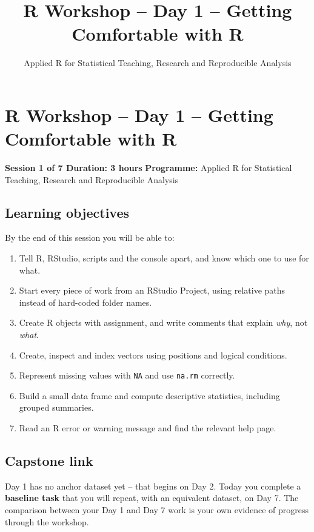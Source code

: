 \documentclass[11pt]{article}
\title{R Workshop -- Day 1 -- Getting Comfortable with R}
\author{Applied R for Statistical Teaching, Research and Reproducible Analysis}
\date{}
\providecommand{\tightlist}{%
  \setlength{\itemsep}{0pt}\setlength{\parskip}{0pt}}
\begin{document}
\maketitle
\tableofcontents
\newpage
\hypertarget{r-workshop-day-1-getting-comfortable-with-r}{%
\section{R Workshop -- Day 1 -- Getting Comfortable with
R}\label{r-workshop-day-1-getting-comfortable-with-r}}

\textbf{Session 1 of 7 \textbar{} Duration: 3 hours} \textbf{Programme:}
Applied R for Statistical Teaching, Research and Reproducible Analysis

\hypertarget{learning-objectives}{%
\subsection{Learning objectives}\label{learning-objectives}}

By the end of this session you will be able to:

\begin{enumerate}
\def\labelenumi{\arabic{enumi}.}
\tightlist
\item
  Tell R, RStudio, scripts and the console apart, and know which one to
  use for what.
\item
  Start every piece of work from an RStudio Project, using relative
  paths instead of hard-coded folder names.
\item
  Create R objects with assignment, and write comments that explain
  \emph{why}, not \emph{what}.
\item
  Create, inspect and index vectors using positions and logical
  conditions.
\item
  Represent missing values with \texttt{NA} and use \texttt{na.rm}
  correctly.
\item
  Build a small data frame and compute descriptive statistics, including
  grouped summaries.
\item
  Read an R error or warning message and find the relevant help page.
\end{enumerate}

\hypertarget{capstone-link}{%
\subsection{Capstone link}\label{capstone-link}}

Day 1 has no anchor dataset yet -- that begins on Day 2. Today you
complete a \textbf{baseline task} that you will repeat, with an
equivalent dataset, on Day 7. The comparison between your Day 1 and Day
7 work is your own evidence of progress through the workshop.
\end{document}
